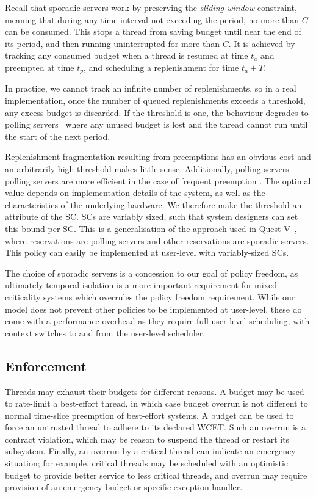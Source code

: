 Recall that sporadic servers work by preserving the
\emph{sliding window} constraint, meaning that during any time
interval not exceeding the period, no more than $C$ can be consumed.
This stops a thread from saving budget until near the end of its
period, and then running uninterrupted for more than $C$. It is achieved by tracking any consumed
budget when a thread is resumed at time $t_{a}$ and preempted at time $t_{p}$, and 
scheduling a replenishment for time $t_{a} + T$.

In practice, we cannot track an infinite number of
replenishments, so in a real implementation, once the number of
queued replenishments exceeds a threshold, any excess budget is
discarded. If the threshold is one, the behaviour degrades to polling
servers~\citep{Sprunt_SL_89a} where any unused budget is lost and the
thread cannot run until the start of the next period. 

Replenishment fragmentation resulting from preemptions has an obvious cost 
and an arbitrarily high threshold makes little sense. Additionally, polling servers
polling servers are more efficient in the
case of frequent preemption \citep{Li_WCM_14}. The optimal value depends on
implementation details of the system, as well as the characteristics
of the underlying hardware. We therefore make the threshold an attribute of the SC. \glspl{SC} are variably sized,
such that system designers can set this bound per SC. This is a generalisation of the approach used
in Quest-V~\citep{Danish_LW_11}, where \IO reservations are polling servers and other reservations 
are sporadic servers. This policy can easily be implemented at user-level with variably-sized
\glspl{SC}.

The choice of sporadic servers is a concession to our goal of policy freedom, as ultimately temporal
isolation is a more important requirement for mixed-criticality systems which overrules the policy
freedom requirement. While our model does not prevent other policies to be implemented at user-level, these
do come with a performance overhead as they require full user-level scheduling, with context
switches to and from the user-level scheduler.

\subsection{Enforcement}
\label{sec:model-enforcement}

Threads may exhaust their budgets for different reasons. A budget may
be used to rate-limit a best-effort thread, in which case budget
overrun is not different to normal time-slice preemption of
best-effort systems. A budget can be used to force an untrusted thread
to adhere to its declared WCET. Such an overrun is a contract violation, which may be reason
to suspend the thread or restart its subsystem. Finally, an overrun by
a critical thread can indicate an emergency situation; for example,
critical threads may be scheduled with an optimistic budget to provide
better service to less critical threads, and overrun may require
provision of an emergency budget or specific exception handler.

